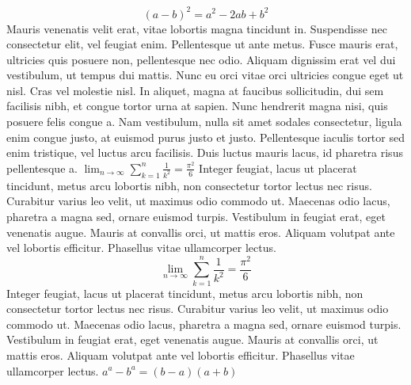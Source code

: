 \documentclass{article}
\begin{document}
\begin{equation}
(a-b)^{2}=a^{2}-2ab+b^{2} 
\end{equation}
Mauris venenatis velit erat, vitae lobortis magna tincidunt in. Suspendisse nec consectetur elit, vel feugiat enim. Pellentesque ut ante metus. Fusce mauris erat, ultricies quis posuere non, pellentesque nec odio. Aliquam dignissim erat vel dui vestibulum, ut tempus dui mattis. Nunc eu orci vitae orci ultricies congue eget ut nisl. Cras vel molestie nisl. In aliquet, magna at faucibus sollicitudin, dui sem facilisis nibh, et congue tortor urna at sapien.
Nunc hendrerit magna nisi, quis posuere felis congue a. Nam vestibulum, nulla sit amet sodales consectetur, ligula enim congue justo, at euismod purus justo et justo. Pellentesque iaculis tortor sed enim tristique, vel luctus arcu facilisis. Duis luctus mauris lacus, id pharetra risus pellentesque a.
$\lim_{n \to \infty}
\sum_{k=1}^n \frac{1}{k^2}
= \frac{\pi^2}{6}$
 Integer feugiat, lacus ut placerat tincidunt, metus arcu lobortis nibh, non consectetur tortor lectus nec risus. Curabitur varius leo velit, ut maximus odio commodo ut. Maecenas odio lacus, pharetra a magna sed, ornare euismod turpis. Vestibulum in feugiat erat, eget venenatis augue. Mauris at convallis orci, ut mattis eros. Aliquam volutpat ante vel lobortis efficitur. Phasellus vitae ullamcorper lectus.
$$
\lim_{n \to \infty}
\sum_{k=1}^n \frac{1}{k^2}
= \frac{\pi^2}{6}
$$
 Integer feugiat, lacus ut placerat tincidunt, metus arcu lobortis nibh, non consectetur tortor lectus nec risus. Curabitur varius leo velit, ut maximus odio commodo ut. Maecenas odio lacus, pharetra a magna sed, ornare euismod turpis. Vestibulum in feugiat erat, eget venenatis augue. Mauris at convallis orci, ut mattis eros. Aliquam volutpat ante vel lobortis efficitur. Phasellus vitae ullamcorper lectus.
\begin{math}
    a^{a}-b^{a} = (b - a)(a + b)
\end{math}
\end{document}
